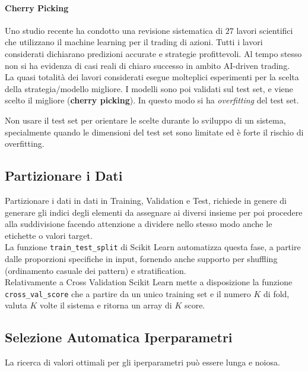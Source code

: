 \paragraph{Cherry Picking}\label{par:cherry_picking} %
Uno studio recente ha condotto una revisione sistematica di $27$ lavori scientifici che utilizzano il machine learning per il trading di azioni.
Tutti i lavori considerati dichiarano predizioni accurate e strategie profittevoli.
Al tempo stesso non si ha evidenza di casi reali di chiaro successo in ambito AI-driven trading.
\\
La quasi totalità dei lavori considerati esegue molteplici esperimenti per la scelta della strategia/modello migliore.
I modelli sono poi validati sul test set, e viene scelto il migliore (\textbf{cherry picking}).
In questo modo si ha \textit{overfitting} del test set.
\begin{warning}
    Non usare il test set per orientare le scelte durante lo sviluppo di un sistema, specialmente quando le dimensioni del test set sono limitate ed è forte il rischio di overfitting.
\end{warning}
%
\subsection{Partizionare i Dati}\label{sec:partizionare_i_dati} %
Partizionare i dati in dati in Training, Validation e Test, richiede in genere di generare gli indici degli elementi da assegnare ai diversi insieme per poi procedere alla suddivisione facendo attenzione a dividere nello stesso modo anche le etichette o valori target.
\\
La funzione \texttt{train\_test\_split} di Scikit Learn automatizza questa fase, a partire dalle proporzioni specifiche in input, fornendo anche supporto per shuffling (ordinamento casuale dei pattern) e stratification.
\\
Relativamente a Cross Validation Scikit Learn mette a disposizione la funzione \texttt{cross\_val\_score} che a partire da un unico training set e il numero $K$ di fold, valuta $K$ volte il sistema e ritorna un array di $K$ score.
%
\subsection{Selezione Automatica Iperparametri}\label{sec:selezione_automatica_iperparametri} %
La ricerca di valori ottimali per gli iperparametri può essere lunga e noiosa.
